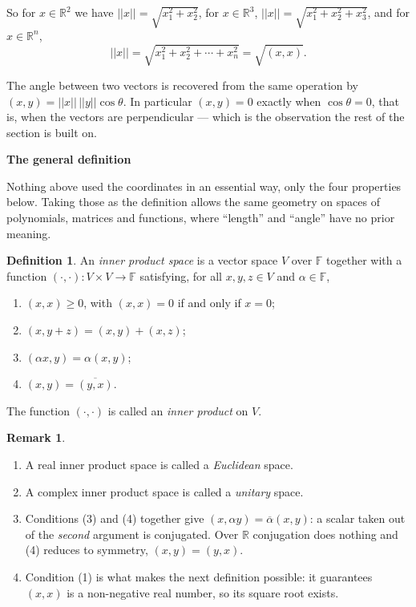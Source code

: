 \documentclass[11pt,a4paper]{article}
\theoremstyle{definition}
\newtheorem{defn}[thm]{Definition}
\newtheorem*{remark}{Remark}
\newcommand{\subhead}[1]{%
  \par\medskip\noindent\textbf{#1}\par\nobreak\smallskip}
\begin{document}
So for $x\in \mathbb{R}^2$ we have $||x||=\sqrt{x^2_1+x^2_2}$, for
$x\in \mathbb{R}^3$, $||x||=\sqrt{x^2_1+x^2_2+x^2_3}$, and for
$x\in \mathbb{R}^n$,
$$||x||=\sqrt{x^2_1+x^2_2+\cdots+x^2_n}=\sqrt{(x,x)}.$$

The angle between two vectors is recovered from the same operation by
$(x,y)=||x||\,||y||\cos\theta$. In particular $(x,y)=0$ exactly when
$\cos\theta=0$, that is, when the vectors are perpendicular --- which is the
observation the rest of the section is built on.

\subhead{The general definition}
Nothing above used the coordinates in an essential way, only the four
properties below. Taking those as the definition allows the same geometry on
spaces of polynomials, matrices and functions, where ``length'' and ``angle''
have no prior meaning.

\begin{defn}
An \emph{inner product space} is a vector space $V$ over $\mathbb{F}$ together
with a function $(\cdot,\cdot):V\times V\longrightarrow \mathbb{F}$ satisfying,
for all $x,y,z\in V$ and $\alpha \in \mathbb{F}$,
\begin{enumerate}
\item $(x,x)\geq 0$, with $(x,x)=0$ if and only if $x=0$;
\item $(x,y+z)=(x,y)+(x,z)$;
\item $(\alpha x,y)=\alpha (x,y)$;
\item $(x,y)=\overline{(y,x)}$.
\end{enumerate}
The function $(\cdot,\cdot)$ is called an \emph{inner product} on $V$.
\end{defn}

\begin{remark}
\begin{enumerate}
\item[i.] A real inner product space is called a \emph{Euclidean} space.
\item[ii.] A complex inner product space is called a \emph{unitary} space.
\item[iii.] Conditions (3) and (4) together give
$(x,\alpha y)=\overline{\alpha}(x,y)$: a scalar taken out of the \emph{second}
argument is conjugated. Over $\mathbb{R}$ conjugation does nothing and (4)
reduces to symmetry, $(x,y)=(y,x)$.
\item[iv.] Condition (1) is what makes the next definition possible: it
guarantees $(x,x)$ is a non-negative real number, so its square root exists.
\end{enumerate}
\end{remark}
\end{document}
